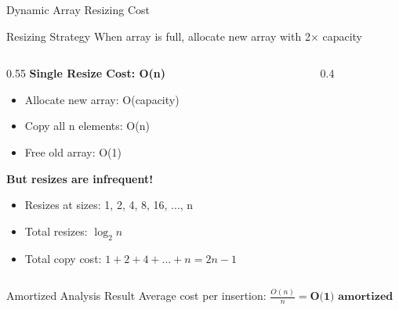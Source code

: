 \documentclass[aspectratio=169,xcolor=dvipsnames]{beamer}
\begin{document}
\begin{frame}{Dynamic Array Resizing Cost}
  \begin{block}{Resizing Strategy}
    When array is full, allocate new array with 2× capacity
  \end{block}

  \vspace{0.3cm}

  \begin{columns}
    \begin{column}{0.55\textwidth}
      \textbf{Single Resize Cost: O(n)}
      \begin{itemize}
        \item Allocate new array: O(capacity)
        \item Copy all n elements: O(n)
        \item Free old array: O(1)
      \end{itemize}

      \vspace{0.3cm}

      \textbf{But resizes are infrequent!}
      \begin{itemize}
        \item Resizes at sizes: 1, 2, 4, 8, 16, ..., n
        \item Total resizes: $\log_2 n$
        \item Total copy cost: $1 + 2 + 4 + ... + n = 2n - 1$
      \end{itemize}
    \end{column}
    \begin{column}{0.4\textwidth}
    \end{column}
  \end{columns}

  \vspace{0.3cm}

  \begin{exampleblock}{Amortized Analysis Result}
    Average cost per insertion: $\frac{O(n)}{n} = \textbf{O(1) amortized}$
  \end{exampleblock}
\end{frame}
\end{document}
